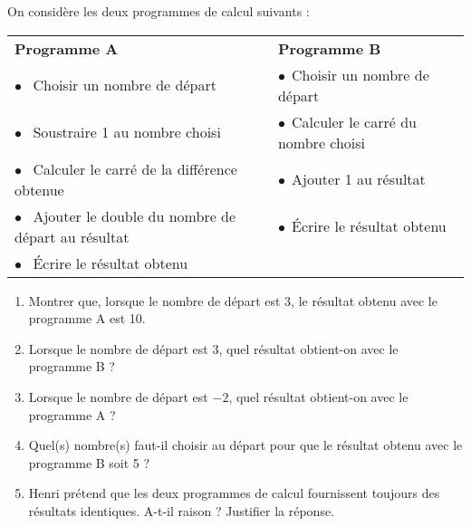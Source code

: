 
\medskip 

On considère les deux programmes de calcul suivants : 

\medskip

\begin{tabularx}{\linewidth}{|m{6cm}|X|}\hline
\textbf{Programme A}&   \textbf{Programme B}\\   
$\bullet~~$ Choisir un nombre de départ &$\bullet~~$Choisir un nombre de départ \\  
$\bullet~~$  Soustraire 1 au nombre choisi&$\bullet~~$Calculer le carré du nombre choisi  \\ 
$\bullet~~$  Calculer le carré de la différence obtenue&$\bullet~~$Ajouter 1 au résultat   \\
$\bullet~~$  Ajouter le double du nombre de départ au résultat&$\bullet~~$Écrire le résultat obtenu\\   
$\bullet~~$  Écrire le résultat obtenu & \\ \hline
\end{tabularx}

\medskip

\begin{enumerate}
\item Montrer que, lorsque le nombre de départ est 3, le résultat obtenu avec le programme A est 10. 
\item Lorsque le nombre de départ est 3, quel résultat obtient-on avec le programme B ? 
\item Lorsque le nombre de départ est $- 2$, quel résultat obtient-on avec le programme A ? 
\item Quel(s) nombre(s) faut-il choisir au départ pour que le résultat obtenu avec le programme B soit 5 ? 
\item Henri prétend que les deux programmes de calcul fournissent toujours des résultats identiques. 
A-t-il raison ? Justifier la réponse. 
\end{enumerate}

\bigskip

